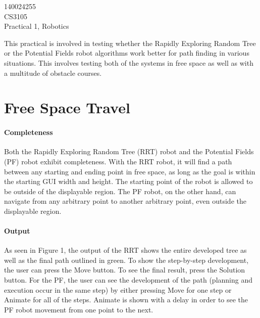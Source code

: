 \documentclass[12pt]{article}
\begin{document}
\begin{flushright}
140024255\\
CS3105\\
Practical 1, Robotics
\end{flushright}

This practical is involved in testing whether the Rapidly Exploring Random Tree or the Potential Fields robot algorithms work better for path finding in various situations. This involves testing both of the systems in free space as well as with a multitude of obstacle courses.

\section{Free Space Travel}
\paragraph*{Completeness}
Both the Rapidly Exploring Random Tree (RRT) robot and the Potential Fields (PF) robot exhibit completeness. With the RRT robot, it will find a path between any starting and ending point in free space, as long as the goal is within the starting GUI width and height. The starting point of the robot is allowed to be outside of the displayable region. The PF robot, on the other hand, can navigate from any arbitrary point to another arbitrary point, even outside the displayable region.

\paragraph*{Output}
As seen in Figure 1, the output of the RRT shows the entire developed tree as well as the final path outlined in green. To show the step-by-step development, the user can press the Move button. To see the final result, press the Solution button. For the PF, the user can see the development of the path (planning and execution occur in the same step) by either pressing Move for one step or Animate for all of the steps. Animate is shown with a delay in order to see the PF robot movement from one point to the next.
\end{document}
